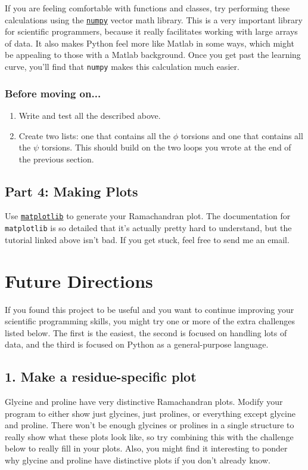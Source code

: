 \documentclass{article}
\newcommand{\bbphi}{\ensuremath{\phi}}
\newcommand{\bbpsi}{\ensuremath{\psi}}
\newcommand{\module}[2]{\href{#2}{\texttt{#1}}}
\newenvironment{problems}
{\subsubsection{Before moving on...} \begin{enumerate}}
{\end{enumerate}}
\begin{document}
If you are feeling comfortable with functions and classes, try performing these 
calculations using the 
\module{numpy}{http://wiki.scipy.org/Tentative_NumPy_Tutorial} vector math 
library.  This is a very important library for scientific programmers, because 
it really facilitates working with large arrays of data.  It also makes Python 
feel more like Matlab in some ways, which might be appealing to those with a 
Matlab background.  Once you get past the learning curve, you'll find that 
\texttt{numpy} makes this calculation much easier.

\begin{problems}
 \item Write and test all the described above.
 \item Create two lists: one that contains all the \bbphi{} torsions and one 
  that contains all the \bbpsi{} torsions.  This should build on the two loops 
  you wrote at the end of the previous section.
\end{problems}

\subsection{Part 4: Making Plots}

Use \module{matplotlib}{http://matplotlib.org/users/pyplot_tutorial.html} to 
generate your Ramachandran plot.  The documentation for \texttt{matplotlib} is 
so detailed that it's actually pretty hard to understand, but the tutorial 
linked above isn't bad.  If you get stuck, feel free to send me an email.

\pagebreak

\section{Future Directions}

If you found this project to be useful and you want to continue improving your 
scientific programming skills, you might try one or more of the extra 
challenges listed below.  The first is the easiest, the second is focused on 
handling lots of data, and the third is focused on Python as a general-purpose 
language.

\subsection{1. Make a residue-specific plot}

Glycine and proline have very distinctive Ramachandran plots.  Modify your 
program to either show just glycines, just prolines, or everything except 
glycine and proline.  There won't be enough glycines or prolines in a single 
structure to really show what these plots look like, so try combining this with 
the challenge below to really fill in your plots.  Also, you might find it 
interesting to ponder why glycine and proline have distinctive plots if you 
don't already know.
\end{document}
